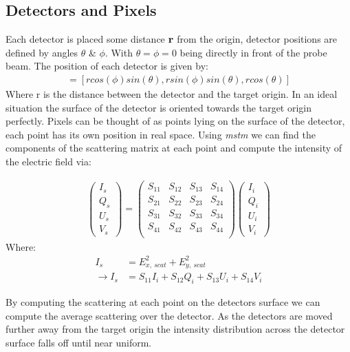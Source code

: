 \subsection{Detectors and Pixels}
Each detector is placed some distance $\bf r$ from the origin, 
detector positions are defined by angles $\theta$ \& $\phi$. With 
$\theta=\phi=0$ being directly in front of the probe beam. The 
position of each detector is given by:
\begin{align}
	[x_{fiber}, y_{fiber}, z_{fiber}] = [rcos(\phi)sin(\theta), rsin(\phi)sin(\theta), rcos(\theta)]
\end{align}
Where r is the distance between the detector and the target origin. 
In an ideal situation the surface of the detector is oriented towards 
the target origin perfectly. Pixels can be thought of as points lying 
on the surface of the detector, each point has its own position in real
space. Using \textit{mstm} we can find the components of the scattering 
matrix at each point and compute the intensity of the electric field via:

\begin{align}
	\begin{pmatrix}
		I_s \\ Q_s \\ U_s \\ V_s
	\end{pmatrix} = 
	\begin{pmatrix}
		S_{11} & S_{12} & S_{13} & S_{14} \\
		S_{21} & S_{22} & S_{23} & S_{24} \\
		S_{31} & S_{32} & S_{33} & S_{34} \\
		S_{41} & S_{42} & S_{43} & S_{44} \\
	\end{pmatrix}
	\begin{pmatrix}
		I_i \\ Q_i \\ U_i \\ V_i
	\end{pmatrix}
\end{align}
Where:
\begin{align}
	I_s &= E_{x,\ scat}^2+E_{y,\ scat}^2 \\
	\rightarrow I_s &= S_{11}I_i+S_{12}Q_i+S_{13}U_i+S_{14}V_i
\end{align}

By computing the scattering at each point on the detectors surface 
we can compute the average scattering over the detector. As the 
detectors are moved further away from the target origin the intensity 
distribution across the detector surface falls off until near uniform.


